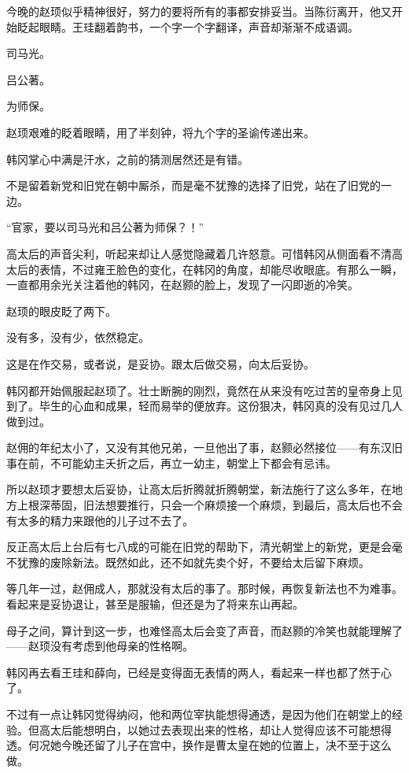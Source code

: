今晚的赵顼似乎精神很好，努力的要将所有的事都安排妥当。当陈衍离开，他又开始眨起眼睛。王珪翻着韵书，一个字一个字翻译，声音却渐渐不成语调。

司马光。

吕公著。

为师保。

赵顼艰难的眨着眼睛，用了半刻钟，将九个字的圣谕传递出来。

韩冈掌心中满是汗水，之前的猜测居然还是有错。

不是留着新党和旧党在朝中厮杀，而是毫不犹豫的选择了旧党，站在了旧党的一边。

“官家，要以司马光和吕公著为师保？！”

高太后的声音尖利，听起来却让人感觉隐藏着几许怒意。可惜韩冈从侧面看不清高太后的表情，不过雍王脸色的变化，在韩冈的角度，却能尽收眼底。有那么一瞬，一直都用余光关注着他的韩冈，在赵颢的脸上，发现了一闪即逝的冷笑。

赵顼的眼皮眨了两下。

没有多，没有少，依然稳定。

这是在作交易，或者说，是妥协。跟太后做交易，向太后妥协。

韩冈都开始佩服起赵顼了。壮士断腕的刚烈，竟然在从来没有吃过苦的皇帝身上见到了。毕生的心血和成果，轻而易举的便放弃。这份狠决，韩冈真的没有见过几人做到过。

赵佣的年纪太小了，又没有其他兄弟，一旦他出了事，赵颢必然接位——有东汉旧事在前，不可能幼主夭折之后，再立一幼主，朝堂上下都会有忌讳。

所以赵顼才要想太后妥协，让高太后折腾就折腾朝堂，新法施行了这么多年，在地方上根深蒂固，旧法想要推行，只会一个麻烦接一个麻烦，到最后，高太后也不会有太多的精力来跟他的儿子过不去了。

反正高太后上台后有七八成的可能在旧党的帮助下，清光朝堂上的新党，更是会毫不犹豫的废除新法。既然如此，还不如就先卖个好，不要给太后留下麻烦。

等几年一过，赵佣成人，那就没有太后的事了。那时候，再恢复新法也不为难事。看起来是妥协退让，甚至是服输，但还是为了将来东山再起。

母子之间，算计到这一步，也难怪高太后会变了声音，而赵颢的冷笑也就能理解了——赵顼没有考虑到他母亲的性格啊。

韩冈再去看王珪和薛向，已经是变得面无表情的两人，看起来一样也都了然于心了。

不过有一点让韩冈觉得纳闷，他和两位宰执能想得通透，是因为他们在朝堂上的经验。但高太后能想明白，以她过去表现出来的性格，却让人觉得应该不可能想得透。何况她今晚还留了儿子在宫中，换作是曹太皇在她的位置上，决不至于这么做。


